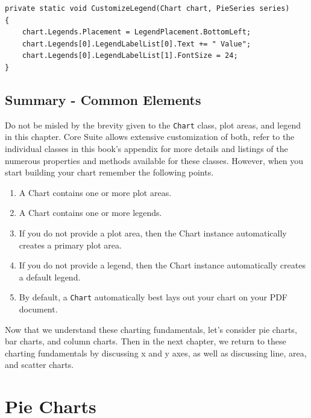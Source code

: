 \documentclass[american]{tufte-book}
\numberwithin{equation}{section}
\numberwithin{figure}{section}
\begin{document}
{\begin{figure}
\end{figure}

\bgroup{}
\begin{lstlisting}[caption={Customizing a legend.},label={lis:Customizing-a-legend.},basicstyle={\footnotesize\ttfamily},breaklines=true]
private static void CustomizeLegend(Chart chart, PieSeries series)
{
    chart.Legends.Placement = LegendPlacement.BottomLeft;
    chart.Legends[0].LegendLabelList[0].Text += " Value";
    chart.Legends[0].LegendLabelList[1].FontSize = 24;
}
\end{lstlisting}
\leavevmode\egroup


\subsection{Summary - Common Elements}

Do not be misled by the brevity given to the \texttt{Chart} class,
plot areas, and legend in this chapter. Core Suite allows extensive
customization of both, refer to the individual classes in this book's
appendix for more details and listings of the numerous properties
and methods available for these classes. However, when you start building
your chart remember the following points.
\begin{enumerate}
\item A Chart contains one or more plot areas.
\item A Chart contains one or more legends.
\item If you do not provide a plot area, then the Chart instance automatically
creates a primary plot area.
\item If you do not provide a legend, then the Chart instance automatically
creates a default legend. 
\item By default, a \texttt{Chart} automatically best lays out your chart
on your PDF document.
\end{enumerate}
Now that we understand these charting fundamentals, let's consider
pie charts, bar charts, and column charts. Then in the next chapter,
we return to these charting fundamentals by discussing x and y axes,
as well as discussing line, area, and scatter charts.

\section{Pie Charts}\label{sec:Pie-Charts}

}
\end{document}
